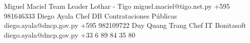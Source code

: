 %
%
%

\begin{referees}
		{Miguel Maciel}
		{Team Leader}
		{Lothar - Tigo}
		{miguel.maciel@tigo.net.py}
		{+595 981646333}
		{Diego Ayala}
		{Chef DB}
		{Contrataciones Públicas}
		{diego.ayala@dncp.gov.py}
		{+595 982109722}
		{Duy Quang Trang}
		{Chef IT}
		{Bonitasoft}
		{diego.ayala@dncp.gov.py}
		{+33 6 89 84 35 80‬}
\end{referees}